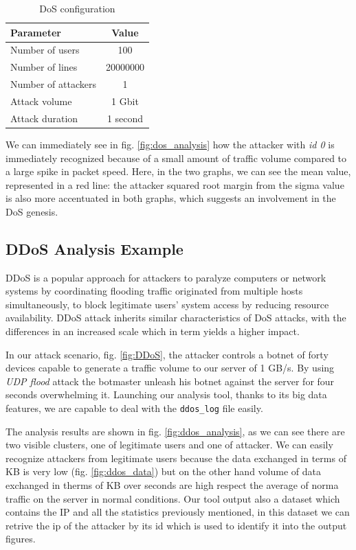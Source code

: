 \begin{table}[h]
\centering
\begin{tabular}{|l|c|}
\hline
\textbf{Parameter} & \textbf{Value} \\ \hline
 Number of users & 100 \\ 
 Number of lines & 20000000 \\ 
 Number of attackers & 1 \\ 
 Attack volume & 1 Gbit \\
 Attack duration & 1 second \\  
 \hline 
\end{tabular}
\caption{DoS configuration}
\label{tab:tab:dos_config}
\end{table}

We can immediately see in fig. \ref{fig:dos_analysis} how the attacker with \textit{id 0} is immediately recognized because of a small amount of traffic volume compared to a large spike in packet speed. Here, in the two graphs, we can see the mean value, represented in a red line: the attacker squared root margin from the sigma value is also more accentuated in both graphs, which suggests an involvement in the DoS genesis.

\subsection{DDoS Analysis Example}
DDoS is a popular approach for attackers to paralyze computers or network systems by coordinating flooding traffic originated from multiple hosts simultaneously, to block legitimate users' system access by reducing resource availability. DDoS attack inherits similar characteristics of DoS attacks, with the differences in an increased scale which in term yields a higher impact\cite{ddos_forensics}.

In our attack scenario, fig. \ref{fig:DDoS},  the attacker controls a botnet of forty devices capable to generate a traffic volume to our server of 1 GB/s. By using \textit{UDP flood} attack the botmaster unleash his botnet against the server for four seconds overwhelming it. Launching our analysis tool, thanks to its big data features, we are capable to deal with the \texttt{ddos\_log} file easily.

The analysis results are shown in fig. \ref{fig:ddos_analysis}, as we can see there are two  visible clusters, one of legitimate users and one of attacker. We can easily recognize attackers from legitimate users because the data exchanged in terms of KB is very low (fig. \ref{fig:ddos_data}) but on the other hand volume of data exchanged in therms of KB over seconds are high respect the average of norma traffic on the server in normal conditions. Our tool output also a dataset which contains the IP and all the statistics previously mentioned, in this dataset we can retrive the ip of the attacker by its id which is used to identify it into the output figures. 
